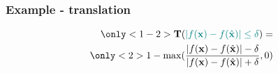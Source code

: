 \documentclass[t,compress,aspectratio=169]{beamer}
\newcommand{\translation}{\mathbf{T}}
\newcommand{\coloured}[1]{\textcolor{MyColour}{#1}}
\begin{document}
\begin{frame}
\frametitle{Example - translation}
\begin{align*}
\only<1-2>{\large{\translation (\coloured{ |f(\x) - f(\hat{\x})| \leq \delta}) }=}\\
\only<2>{1 - \max(\dfrac{| f(\x) - f(\hat{\x})| - \delta}{|f(\x) - f(\hat{\x})| + \delta},0) }
\end{align*}
\end{frame}
\end{document}
